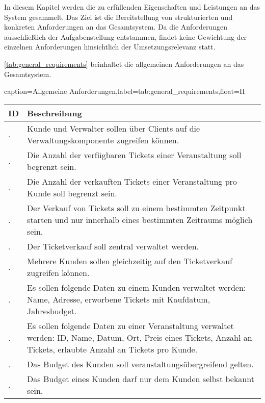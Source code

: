 In diesem Kapitel werden die zu erfüllenden Eigenschaften und Leistungen an das System gesammelt. 
Das Ziel ist die Bereitstellung von strukturierten und konkreten Anforderungen an das Gesamtsystem.
Da die Anforderungen ausschließlich der Aufgabenstellung entstammen, findet keine Gewichtung der einzelnen Anforderungen hinsichtlich der Umsetzungsrelevanz statt.

\autoref{tab:general_requirements} beinhaltet die allgemeinen Anforderungen an das Gesamtsystem.

\newcommand\inctablenumber{\stepcounter{tablenumber}}
\newcommand\tablenumber{\arabic{tablenumber}}
\newcommand\incrownumber{\stepcounter{rownumber}}
\newcommand\rownumber{\arabic{rownumber}}
\setcounter{tablenumber}{1}
\setcounter{rownumber}{1}
\begin{dhbwtable}{caption={Allgemeine Anforderungen},label=tab:general_requirements,float=H}
    \begin{tabularx}{\textwidth}{l | X}
        \toprule
        \textbf{ID} & \textbf{Beschreibung}  \\\midrule
        \tablenumber .\rownumber & Kunde und Verwalter sollen über Clients auf die Verwaltungskomponente zugreifen können. \\\midrule\incrownumber
        \tablenumber .\rownumber & Die Anzahl der verfügbaren Tickets einer Veranstaltung soll begrenzt sein. \\\midrule\incrownumber
        \tablenumber .\rownumber & Die Anzahl der verkauften Tickets einer Veranstaltung pro Kunde soll begrenzt sein. \\\midrule\incrownumber
        \tablenumber .\rownumber & Der Verkauf von Tickets soll zu einem bestimmten Zeitpunkt starten und nur innerhalb eines bestimmten Zeitraums möglich sein. \\\midrule\incrownumber
        \tablenumber .\rownumber & Der Ticketverkauf soll zentral verwaltet werden. \\\midrule\incrownumber
        \tablenumber .\rownumber & Mehrere Kunden sollen gleichzeitig auf den Ticketverkauf zugreifen können. \\\midrule\incrownumber
        \tablenumber .\rownumber & Es sollen folgende Daten zu einem Kunden verwaltet werden: Name, Adresse, erworbene Tickets mit Kaufdatum, Jahresbudget. \\\midrule\incrownumber
        \tablenumber .\rownumber & Es sollen folgende Daten zu einer Veranstaltung verwaltet werden: ID, Name, Datum, Ort, Preis eines Tickets, Anzahl an Tickets, erlaubte Anzahl an Tickets pro Kunde. \\\midrule\incrownumber
        \tablenumber .\rownumber & Das Budget des Kunden soll veranstaltungsübergreifend gelten. \\\midrule\incrownumber
        \tablenumber .\rownumber & Das Budget eines Kunden darf nur dem Kunden selbst bekannt sein.  \\\bottomrule
    \end{tabularx}    
\end{dhbwtable}


